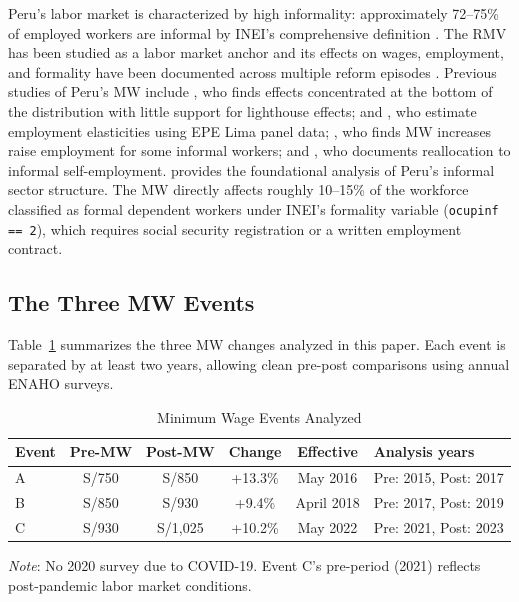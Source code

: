 \documentclass[12pt]{article}
\begin{document}
Peru's labor market is characterized by high informality: approximately 72--75\% of employed workers are informal by INEI's comprehensive definition \citep{yamada1996, chacaltana2001, jaramillo2006, diaz2014}. The RMV has been studied as a labor market anchor and its effects on wages, employment, and formality have been documented across multiple reform episodes \citep{jaramillo2004, cespedes2006, cespedes2014, jaramillo2012, corcuera2024}. Previous studies of Peru's MW include \citet{jaramillo2004}, who finds effects concentrated at the bottom of the distribution with little support for lighthouse effects; \citet{cespedes2006} and \citet{cespedes2014}, who estimate employment elasticities using EPE Lima panel data; \citet{jaramillo2012}, who finds MW increases raise employment for some informal workers; and \citet{corcuera2024}, who documents reallocation to informal self-employment. \citet{yamada1996} provides the foundational analysis of Peru's informal sector structure. The MW directly affects roughly 10--15\% of the workforce classified as formal dependent workers under INEI's formality variable (\texttt{ocupinf == 2}), which requires social security registration or a written employment contract.

\subsection{The Three MW Events}

Table~\ref{tab:events} summarizes the three MW changes analyzed in this paper. Each event is separated by at least two years, allowing clean pre-post comparisons using annual ENAHO surveys.

\begin{table}[H]
\centering
\caption{Minimum Wage Events Analyzed}
\label{tab:events}
\begin{threeparttable}
\begin{tabular}{lccccl}
\toprule
Event & Pre-MW & Post-MW & Change & Effective & Analysis years \\
\midrule
A & S/750 & S/850 & +13.3\% & May 2016 & Pre: 2015, Post: 2017 \\
B & S/850 & S/930 & +9.4\% & April 2018 & Pre: 2017, Post: 2019 \\
C & S/930 & S/1,025 & +10.2\% & May 2022 & Pre: 2021, Post: 2023 \\
\bottomrule
\end{tabular}
\begin{tablenotes}
\small
\item \textit{Note}: No 2020 survey due to COVID-19. Event C's pre-period (2021) reflects post-pandemic labor market conditions.
\end{tablenotes}
\end{threeparttable}
\end{table}
\end{document}
